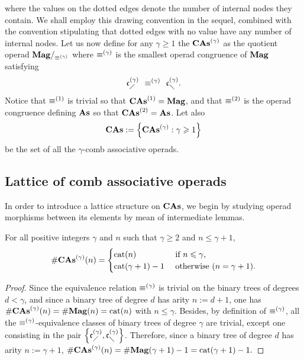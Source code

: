 where the values on the dotted edges denote the number of internal
nodes they contain. We shall employ this drawing convention in the
sequel, combined with the convention stipulating that dotted edges
with no value have any number of internal nodes. Let us now define for
any $\gamma \geq 1$ the 
$\mathbf{CAs}^{\left(\gamma\right)}$ as the quotient operad $\mathbf{Mag}/_{\operatorname{\equiv}^{(\gamma)}}$ where
$\operatorname{\equiv}^{(\gamma)}$ is the smallest operad congruence of $\mathbf{Mag}$
satisfying
\begin{equation} \label{equ:congruence_CAs_gamma}
    \mathfrak{c}^{\left(\gamma\right)}_{\diagup} \enspace \operatorname{\equiv}^{(\gamma)} \enspace \mathfrak{c}^{\left(\gamma\right)}_{\diagdown}.
\end{equation}
Notice that $\operatorname{\equiv}^{(1)}$ is trivial so that
$\mathbf{CAs}^{\left(1\right)} = \mathbf{Mag}$, and that $\operatorname{\equiv}^{(2)}$ is the operad congruence
defining $\mathbf{As}$ so that $\mathbf{CAs}^{\left(2\right)} = \mathbf{As}$. Let also
\begin{equation}
    \mathbf{CAs} := \left\{\mathbf{CAs}^{\left(\gamma\right)} : \gamma\geqslant 1\right\}
\end{equation}
be the set of all the $\gamma$-comb associative operads.
\medbreak

\subsection{Lattice of comb associative operads}
In order to introduce a lattice structure on $\mathbf{CAs}$, we begin by
studying operad morphisms between its elements by mean of intermediate
lemmas.
\medbreak

\begin{Lemma} \label{lem:first_dimensions_CAs}
    For all positive integers $\gamma$ and $n$ such that $\gamma \geq 2$
    and $n \leq \gamma + 1$,
    \begin{equation}
        \# \mathbf{CAs}^{\left(\gamma\right)}(n) =
        \begin{cases}
            \mathrm{cat}(n)
                & \mbox{ if } n \leqslant \gamma, \\
            \mathrm{cat}(\gamma + 1) - 1
                & \mbox{ otherwise } (n = \gamma + 1).
        \end{cases}
    \end{equation}
\end{Lemma}
\begin{proof}
    Since the equivalence relation $\operatorname{\equiv}^{(\gamma)}$ is trivial on the
    binary trees of degrees $d < \gamma$, and since a binary tree of
    degree $d$ has arity $n := d + 1$, one has
    $\# \mathbf{CAs}^{\left(\gamma\right)}(n) = \# \mathbf{Mag}(n) = \mathrm{cat}(n)$ with
    $n \leq \gamma$. Besides, by definition of $\operatorname{\equiv}^{(\gamma)}$, all
    the $\operatorname{\equiv}^{(\gamma)}$-equivalence classes of binary trees of
    degree $\gamma$ are trivial, except one consisting in the pair
    $\left\{\mathfrak{c}^{\left(\gamma\right)}_{\diagup}, \mathfrak{c}^{\left(\gamma\right)}_{\diagdown}\right\}$. Therefore, since a
    binary tree of degree $d$ has arity $n := \gamma + 1$,
    \begin{math}
        \# \mathbf{CAs}^{\left(\gamma\right)}(n)
        = \# \mathbf{Mag}(\gamma + 1) - 1
        = \mathrm{cat}(\gamma + 1) - 1.
    \end{math}
\end{proof}
\medbreak

